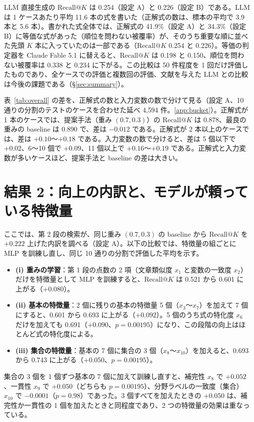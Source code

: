 \documentclass[a4j,dvipdfmx,11pt]{jresume}
\makeatletter
\newcommand{\rk}{\textrm{Recall@}K}
\makeatother
\begin{document}
LLM 直接生成の $\rk$ は 0.254（設定 A）と 0.226（設定 B）である。LLM は 1 ケースあたり平均 11.6 本の式を書いた（正解式の数は、標本の平均で 3.9 本と 5.6 本）。書かれた式全体では、正解式の 41.9\%（設定 A）と 34.3\%（設定 B）に等価な式があった（順位を問わない被覆率）が、そのうち重要な順に並べた先頭 $K$ 本に入っていたのは一部である（$\rk$ 0.254 と 0.226）。等価の判定器を Claude Fable 5.1 に替えると、$\rk$ は 0.198 と 0.150、順位を問わない被覆率は 0.338 と 0.234 に下がる。この比較は 50 件程度を 1 回だけ評価したものであり、全ケースでの評価と複数回の評価、文献を与えた LLM との比較は今後の課題である（\S\ref{sec:summary}）。

表~\ref{tab:overall} の差を、正解式の数と入力変数の数で分けて見る（設定 A、10 通りの分割のテストのケースを合わせた延べ 4{,}594 件。\ref{app:bucket}）。正解式が 1 本のケースでは、提案手法（重み $(0.7, 0.3)$）の $\rk$ は 0.878、最良の重みの baseline は 0.890 で、差は $-0.012$ である。正解式が 2 本以上のケースでは、差は $+0.10$〜$+0.18$ である。入力変数の数で分けると、差は 5 個以下で $+0.02$、6〜10 個で $+0.09$、11 個以上で $+0.16$〜$+0.19$ である。正解式と入力変数が多いケースほど、提案手法と baseline の差は大きい。

\section{結果 2：向上の内訳と、モデルが頼っている特徴量}\label{sec:mech}
ここでは、第 2 段の検索が、同じ重み $(0.7, 0.3)$ の baseline から $\rk$ を $+0.222$ 上げた内訳を調べる（設定 A）。以下の比較では、特徴量の組ごとに MLP を訓練し直し、同じ 10 通りの分割で評価した平均を示す。
\begin{itemize}[leftmargin=1.5em]
  \item \textbf{(i) 重みの学習}：第 1 段の点数の 2 項（文章類似度 $x_1$ と変数の一致度 $x_2$）だけを特徴量として MLP を訓練すると、$\rk$ は 0.521 から 0.601 に上がる（$+0.080$）。
  \item \textbf{(ii) 基本の特徴量}：2 個に残りの基本の特徴量 5 個（$x_3$〜$x_7$）を加えて 7 個にすると、0.601 から 0.693 に上がる（$+0.092$）。5 個のうち式の特化度 $x_6$ だけを加えても 0.691（$+0.090$、$p = 0.00195$）になり、この段階の向上はほとんど式の特化度による。
  \item \textbf{(iii) 集合の特徴量}：基本の 7 個に集合の 3 個（$x_8$〜$x_{10}$）を加えると、0.693 から 0.743 に上がる（$+0.050$、$p = 0.00195$）。
\end{itemize}
集合の 3 個を 1 個ずつ基本の 7 個に加えて訓練し直すと、補完性 $x_8$ で $+0.052$、一貫性 $x_9$ で $+0.050$（どちらも $p = 0.00195$）、分野ラベルの一致度（集合）$x_{10}$ で $-0.0001$（$p = 0.98$）であった。3 個すべてを加えたときの $+0.050$ は、補完性か一貫性の 1 個を加えたときと同程度であり、2 つの特徴量の効果は重なっている。
\end{document}
